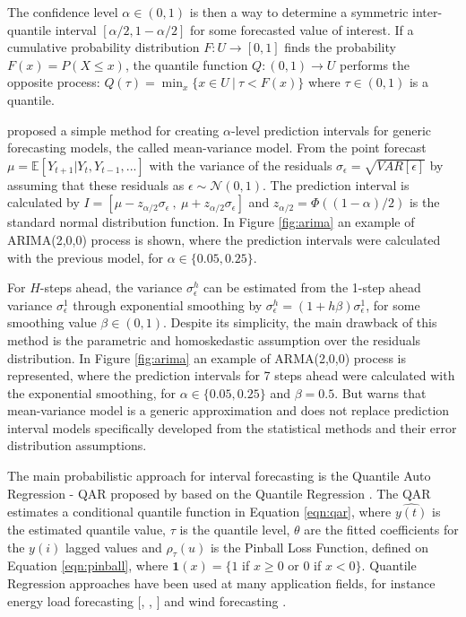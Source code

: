 \index{$\alpha$}
The confidence level $\alpha \in (0,1)$ is then a way to determine a symmetric inter-quantile interval $[\alpha/2, 1-\alpha/2]$ for some forecasted value of interest. If a cumulative probability distribution $F:U \rightarrow [0,1]$ finds the probability $F(x) =  P(X \leq x)$, the quantile function $Q:(0,1) \rightarrow U$ performs the opposite process: $Q(\tau) = \min_x\{ x \in U \ |\ \tau < F(x) \}$ where $\tau \in (0,1)$ is a quantile.


\cite{Chatfield2001} proposed a simple method for creating $\alpha$-level prediction intervals for generic forecasting models, the called mean-variance model. From the point forecast $\mu = \mathbb{E}[Y_{t+1}|Y_t,Y_{t-1},...]$ with the variance of the residuals $\sigma_\epsilon = \sqrt{VAR[\epsilon]}$ by assuming that these residuals as $\epsilon \sim \mathcal{N}(0,1)$. The prediction interval is calculated by $I = [\mu - z_{\alpha/2}\sigma_\epsilon\ ,\ \mu + z_{\alpha/2}\sigma_\epsilon]$ and $z_{\alpha/2} = \Phi((1- \alpha)/2)$ is the standard normal distribution function. In Figure \ref{fig:arima} an example of ARIMA(2,0,0) process is shown, where the prediction intervals were calculated with the previous model, for $\alpha \in \{0.05,0.25\}$. 

For $H$-steps ahead, the variance $\sigma_\epsilon^h$ can be estimated from the 1-step ahead variance $\sigma_\epsilon^1$ through exponential smoothing by $\sigma_\epsilon^h = (1 + h\beta)\sigma_\epsilon^1$, for some smoothing value $\beta \in (0,1)$. Despite its simplicity, the main drawback of this method is the parametric and homoskedastic assumption over the residuals distribution. In Figure \ref{fig:arima} an example of ARMA(2,0,0) process is represented, where the prediction intervals for 7 steps ahead were calculated with the exponential smoothing, for $\alpha \in \{0.05,0.25\}$ and $\beta = 0.5$. But \cite{Chatfield2001} warns that mean-variance model is a generic approximation and does not replace prediction interval models specifically developed from the statistical methods and their error distribution assumptions. 

\index{$\tau$}

The main probabilistic approach for interval forecasting is the Quantile Auto Regression - QAR proposed by \cite{Koenker2006} based on the Quantile Regression \cite{Koenker2001}. The QAR estimates a conditional quantile function in Equation \eqref{eqn:qar}, where $\hat{y(t)}$ is the estimated quantile value, $\tau$ is the quantile level, $\theta$ are the fitted coefficients for the $y(i)$ lagged values and $\rho_\tau(u)$ is the Pinball Loss Function, defined on Equation \eqref{eqn:pinball}, where $\mathbf{1}(x) = \{ 1$ if $x \geq 0$ or $0$ if $x < 0\}$. Quantile Regression approaches have been used at many application fields, for instance energy load forecasting [\cite{Liu2015}, \cite{Hong2016}, \cite{Hong2016a}] and wind forecasting \cite{Pinson2006}.

